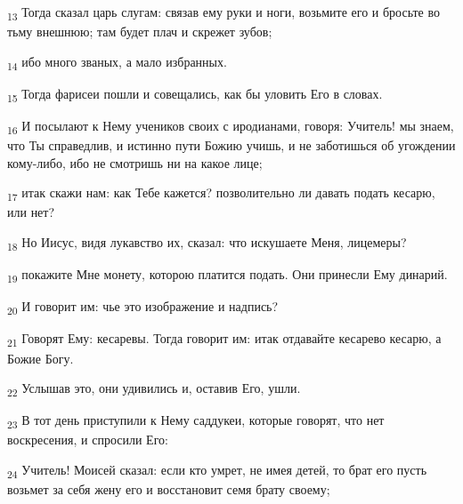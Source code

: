 \begin{tcolorbox}
\textsubscript{13} Тогда сказал царь слугам: связав ему руки и ноги, возьмите его и бросьте во тьму внешнюю; там будет плач и скрежет зубов;
\end{tcolorbox}
\begin{tcolorbox}
\textsubscript{14} ибо много званых, а мало избранных.
\end{tcolorbox}
\begin{tcolorbox}
\textsubscript{15} Тогда фарисеи пошли и совещались, как бы уловить Его в словах.
\end{tcolorbox}
\begin{tcolorbox}
\textsubscript{16} И посылают к Нему учеников своих с иродианами, говоря: Учитель! мы знаем, что Ты справедлив, и истинно пути Божию учишь, и не заботишься об угождении кому-либо, ибо не смотришь ни на какое лице;
\end{tcolorbox}
\begin{tcolorbox}
\textsubscript{17} итак скажи нам: как Тебе кажется? позволительно ли давать подать кесарю, или нет?
\end{tcolorbox}
\begin{tcolorbox}
\textsubscript{18} Но Иисус, видя лукавство их, сказал: что искушаете Меня, лицемеры?
\end{tcolorbox}
\begin{tcolorbox}
\textsubscript{19} покажите Мне монету, которою платится подать. Они принесли Ему динарий.
\end{tcolorbox}
\begin{tcolorbox}
\textsubscript{20} И говорит им: чье это изображение и надпись?
\end{tcolorbox}
\begin{tcolorbox}
\textsubscript{21} Говорят Ему: кесаревы. Тогда говорит им: итак отдавайте кесарево кесарю, а Божие Богу.
\end{tcolorbox}
\begin{tcolorbox}
\textsubscript{22} Услышав это, они удивились и, оставив Его, ушли.
\end{tcolorbox}
\begin{tcolorbox}
\textsubscript{23} В тот день приступили к Нему саддукеи, которые говорят, что нет воскресения, и спросили Его:
\end{tcolorbox}
\begin{tcolorbox}
\textsubscript{24} Учитель! Моисей сказал: если кто умрет, не имея детей, то брат его пусть возьмет за себя жену его и восстановит семя брату своему;
\end{tcolorbox}
